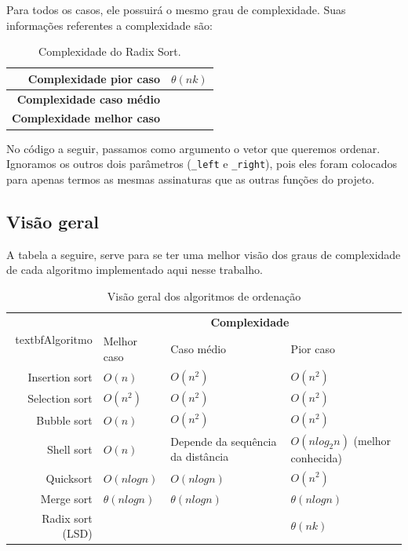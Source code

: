 Para todos os casos, ele possuirá o mesmo grau de complexidade. Suas informações referentes a complexidade são:

\begin{table}[H]
 \centering
	\begin{tabular}{| r | l |}
		\hline
		\textbf{Complexidade pior caso}   & $\theta(nk)$ \\
		\hline
		\textbf{Complexidade caso médio}  & \\
		\hline
		\textbf{Complexidade melhor caso} & \\
		\hline
	\end{tabular}
	\caption{Complexidade do Radix Sort.}
	\label{t_radix_sort}
\end{table}

No código a seguir, passamos como argumento o vetor que queremos ordenar. Ignoramos os outros dois parâmetros (\texttt{\_left} e \texttt{\_right}), pois eles foram colocados para apenas termos as mesmas assinaturas que as outras funções do projeto.



\subsection{Visão geral}
A tabela a seguire, serve para se ter uma melhor visão dos graus de complexidade de cada algoritmo implementado aqui nesse trabalho.

\begin{table}[H]
 \centering
	\begin{tabular}{| r | p{2.5cm} | p{2.5cm} | p{2.5cm} |}
		\hline
		\multirow{2}{*}{textbf{Algoritmo}} & \multicolumn{3}{c|}{\textbf{Complexidade}} \\
		 & Melhor caso   & Caso médio & Pior caso \\
		\hline
		Insertion sort   & $O(n)$          & $O(n^{2})$                        & $O(n^{2})$ \\
		\hline
		Selection sort   & $O(n^{2})$      & $O(n^{2})$                        & $O(n^{2})$ \\
		\hline
		Bubble sort      & $O(n)$          & $O(n^{2})$                        & $O(n^{2})$ \\
		\hline
		Shell sort       & $O(n)$          & Depende da sequência da distância & $O(nlog_{2}n)$ (melhor conhecida) \\
		\hline
		Quicksort        & $O(nlogn)$      & $O(nlogn)$                        & $O(n^{2})$ \\
		\hline
		Merge sort       & $\theta(nlogn)$ & $\theta(nlogn)$                   & $\theta(nlogn)$ \\
		\hline
		Radix sort (LSD) &                 &                                   & $\theta(nk)$ \\
		\hline
	\end{tabular}
	\caption{Visão geral dos algoritmos de ordenação}
	\label{t_visao_geral}
\end{table}

